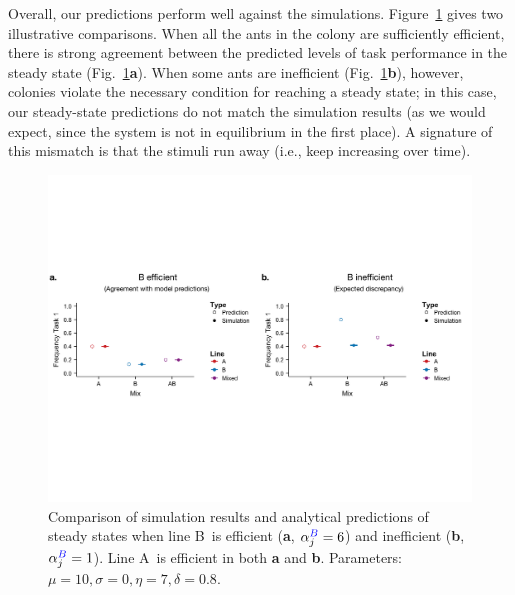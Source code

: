 \documentclass[11pt]{article}
\newcommand{\A}{{\color{red}A}}
\newcommand{\B}{{\color{blue}B}}
\begin{document}
Overall, our predictions perform well against the simulations. Figure~\ref{fig:5050_comp} gives two illustrative comparisons. When all the ants in the colony are sufficiently efficient, there is strong agreement between the predicted levels of task performance in the steady state (Fig.~\ref{fig:5050_comp}\textbf{a}). When some ants are inefficient (Fig.~\ref{fig:5050_comp}\textbf{b}), however, colonies violate the necessary condition for reaching a steady state; in this case, our steady-state predictions do not match the simulation results (as we would expect, since the system is not in equilibrium in the first place). A signature of this mismatch is that the stimuli run away (i.e., keep increasing over time).
\begin{figure}[H]
    \centering
    \includegraphics[trim={0 2.5in 0 2.4in}, clip, width=1\linewidth]{doc/model_comparison_deltaalpha.pdf}
    \caption{Comparison of simulation results and analytical predictions of steady states when line \B\ is efficient (\textbf{a}, $\alpha_j^{\B} = 6$) and inefficient (\textbf{b}, $\alpha_j^{\B} = 1$). Line \A\ is efficient in both \textbf{a} and \textbf{b}. Parameters: $\mu = 10, \sigma = 0, \eta = 7, \delta = 0.8$. }
    \label{fig:5050_comp}
\end{figure}
\end{document}
